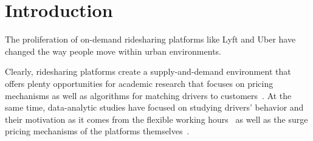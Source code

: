 
\section{Introduction}
\label{sec:introduction}

The proliferation of on-demand ridesharing platforms like Lyft and Uber
have changed the way people move within urban environments. 



Clearly, ridesharing platforms create a supply-and-demand environment that offers 
plenty opportunities for academic research that focuses on pricing mechanisms
as well as algorithms for matching drivers to customers~\cite{}.
At the same time, data-analytic studies have focused
on studying drivers' behavior and their motivation as it comes from the flexible working 
hours~\cite{hall2016analysis} as well as the surge pricing mechanisms of the platforms themselves~\cite{chen2015peeking,chen2016dynamic}.
 